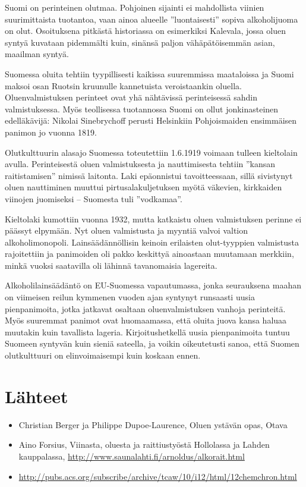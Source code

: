 \documentclass[a4paper,11pt]{report}
\begin{document}
Suomi on perinteinen olutmaa. Pohjoinen sijainti ei mahdollista viinien suurimittaista tuotantoa, vaan ainoa alueelle ''luontaisesti'' sopiva alkoholijuoma on olut. Osoituksena pitkästä historiassa on esimerkiksi Kalevala, jossa oluen syntyä kuvataan pidemmälti kuin, sinänsä paljon vähäpätöisemmän asian, maailman syntyä.

Suomessa oluita tehtiin tyypillisesti kaikissa suuremmissa maataloissa ja Suomi maksoi osan Ruotsin kruunulle kannetuista veroistaankin oluella. Oluenvalmistuksen perinteet ovat yhä nähtävissä perinteisessä sahdin valmistuksessa. Myös teollisessa tuotannossa Suomi on ollut jonkinasteinen edelläkävijä: Nikolai Sinebrychoff perusti Helsinkiin Pohjoismaiden ensimmäisen panimon jo vuonna 1819.

Olutkulttuurin alasajo Suomessa toteutettiin 1.6.1919 voimaan tulleen kieltolain avulla. Perinteisestä oluen valmistuksesta ja nauttimisesta tehtiin ''kansan raitistamisen'' nimissä laitonta. Laki epäonnistui tavoitteessaan, sillä sivistynyt oluen nauttiminen muuttui pirtusalakuljetuksen myötä väkevien, kirkkaiden viinojen juomiseksi -- Suomesta tuli ''vodkamaa''.

Kieltolaki kumottiin vuonna 1932, mutta katkaistu oluen valmistuksen perinne ei päässyt elpymään. Nyt oluen valmistusta ja myyntiä valvoi valtion alkoholimonopoli. Lainsäädännöllisin keinoin erilaisten olut-tyyppien valmistusta rajoitettiin ja panimoiden oli pakko keskittyä ainoastaan muutamaan merkkiin, minkä vuoksi saatavilla oli lähinnä tavanomaisia lagereita.

Alkoholilainsäädäntö on EU-Suomessa vapautumassa, jonka seurauksena maahan on viimeisen reilun kymmenen vuoden ajan syntynyt runsaasti uusia pienpanimoita, jotka jatkavat osaltaan oluenvalmistuksen vanhoja perinteitä. Myös suuremmat panimot ovat huomaamassa, että oluita juova kansa haluaa muutakin kuin tavallista lageria. Kirjoitushetkellä uusia pienpanimoita tuntuu Suomeen syntyvän kuin sieniä sateella, ja voikin oikeutetusti sanoa, että Suomen olutkulttuuri on elinvoimaisempi kuin koskaan ennen.


\section*{Lähteet}

\begin{itemize}
\item{Christian Berger ja Philippe Dupoe-Laurence, Oluen ystävän opas, Otava}
\item{Aino Forsius, Viinasta, oluesta ja raittiustyöstä Hollolassa ja Lahden kauppalassa, \url{http://www.saunalahti.fi/arnoldus/alkorait.html}}
\item{\url{http://pubs.acs.org/subscribe/archive/tcaw/10/i12/html/12chemchron.html}}
\end{itemize}
\end{document}

